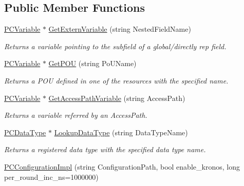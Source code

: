 \subsection*{Public Member Functions}
\begin{DoxyCompactItemize}
\item 
\hyperlink{classpc__emulator_1_1PCVariable}{P\+C\+Variable} $\ast$ \hyperlink{classpc__emulator_1_1PCConfigurationImpl_af21b258249c8e208e658f320dced677d}{Get\+Extern\+Variable} (string Nested\+Field\+Name)\hypertarget{classpc__emulator_1_1PCConfigurationImpl_af21b258249c8e208e658f320dced677d}{}\label{classpc__emulator_1_1PCConfigurationImpl_af21b258249c8e208e658f320dced677d}

\begin{DoxyCompactList}\small\item\em Returns a variable pointing to the subfield of a global/directly rep field. \end{DoxyCompactList}\item 
\hyperlink{classpc__emulator_1_1PCVariable}{P\+C\+Variable} $\ast$ \hyperlink{classpc__emulator_1_1PCConfigurationImpl_ae62ce7358d79b2695bd969d163cae7b7}{Get\+P\+OU} (string Po\+U\+Name)
\begin{DoxyCompactList}\small\item\em Returns a P\+OU defined in one of the resources with the specified name. \end{DoxyCompactList}\item 
\hyperlink{classpc__emulator_1_1PCVariable}{P\+C\+Variable} $\ast$ \hyperlink{classpc__emulator_1_1PCConfigurationImpl_a2d75e4ba41a54ced47134ac9b7a873a8}{Get\+Access\+Path\+Variable} (string Access\+Path)
\begin{DoxyCompactList}\small\item\em Returns a variable referred by an Access\+Path. \end{DoxyCompactList}\item 
\hyperlink{classpc__emulator_1_1PCDataType}{P\+C\+Data\+Type} $\ast$ \hyperlink{classpc__emulator_1_1PCConfigurationImpl_abad943ac691a001ec5606d9d69aa6a0d}{Lookup\+Data\+Type} (string Data\+Type\+Name)
\begin{DoxyCompactList}\small\item\em Returns a registered data type with the specified data type name. \end{DoxyCompactList}\item 
\hyperlink{classpc__emulator_1_1PCConfigurationImpl_ae6e084d4242e24198c0dce6baef45bf1}{P\+C\+Configuration\+Impl} (string Configuration\+Path, bool enable\+\_\+kronos, long per\+\_\+round\+\_\+inc\+\_\+ns=1000000)

\end{DoxyCompactItemize}
